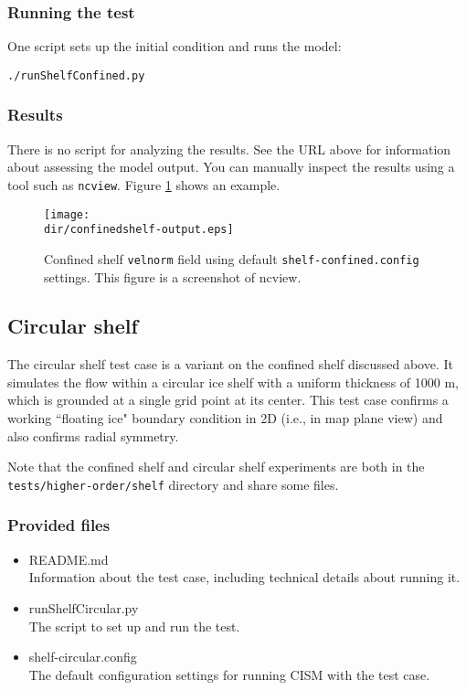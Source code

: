 \subsubsection{Running the test}
One script sets up the initial condition and runs the model:

\texttt{./runShelfConfined.py}

\subsubsection{Results}
There is no script for analyzing the results.  See the URL above for information 
about assessing the model output.
You can manually inspect the results using a tool such as \texttt{ncview}.
Figure \ref{fig:confinedshelf-results} shows an example.

\begin{figure}[H!]
	\centering
	\texttt{[image: \\dir/confinedshelf-output.eps]}
	\caption{Confined shelf \texttt{velnorm} field using default \texttt{shelf-confined.config} settings. This figure is a screenshot of ncview.}
	\label{fig:confinedshelf-results}
\end{figure}
\FloatBarrier

\subsection{Circular shelf}
The circular shelf test case is a variant on the confined shelf discussed above. It simulates the flow within a circular ice shelf with a uniform thickness
of 1000 m, which is grounded at a single grid point at its center. This test case confirms a working ``floating ice" boundary condition
in 2D (i.e., in map plane view) and also confirms radial symmetry. 

Note that the confined shelf and circular shelf experiments are both in the 
\texttt{tests/higher-order/shelf} directory and share some files.

\subsubsection{Provided files}

\begin{itemize}
	\item README.md \\
		Information about the test case, including technical details about running it.
	\item runShelfCircular.py \\
		The script to set up and run the test.
	\item shelf-circular.config \\
          The default configuration settings for running CISM with the test case.
\end{itemize}

